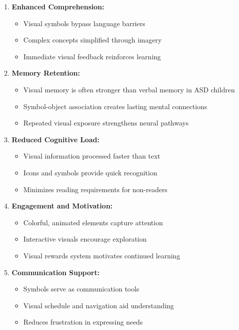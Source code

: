 \documentclass[12pt,a4paper]{article}
\begin{document}
\begin{enumerate}[leftmargin=*]
    \item \textbf{Enhanced Comprehension:}
    \begin{itemize}
        \item Visual symbols bypass language barriers
        \item Complex concepts simplified through imagery
        \item Immediate visual feedback reinforces learning
    \end{itemize}
    
    \item \textbf{Memory Retention:}
    \begin{itemize}
        \item Visual memory is often stronger than verbal memory in ASD children
        \item Symbol-object association creates lasting mental connections
        \item Repeated visual exposure strengthens neural pathways
    \end{itemize}
    
    \item \textbf{Reduced Cognitive Load:}
    \begin{itemize}
        \item Visual information processed faster than text
        \item Icons and symbols provide quick recognition
        \item Minimizes reading requirements for non-readers
    \end{itemize}
    
    \item \textbf{Engagement and Motivation:}
    \begin{itemize}
        \item Colorful, animated elements capture attention
        \item Interactive visuals encourage exploration
        \item Visual rewards system motivates continued learning
    \end{itemize}
    
    \item \textbf{Communication Support:}
    \begin{itemize}
        \item Symbols serve as communication tools
        \item Visual schedule and navigation aid understanding
        \item Reduces frustration in expressing needs
    \end{itemize}
    

\end{enumerate}
\end{document}
